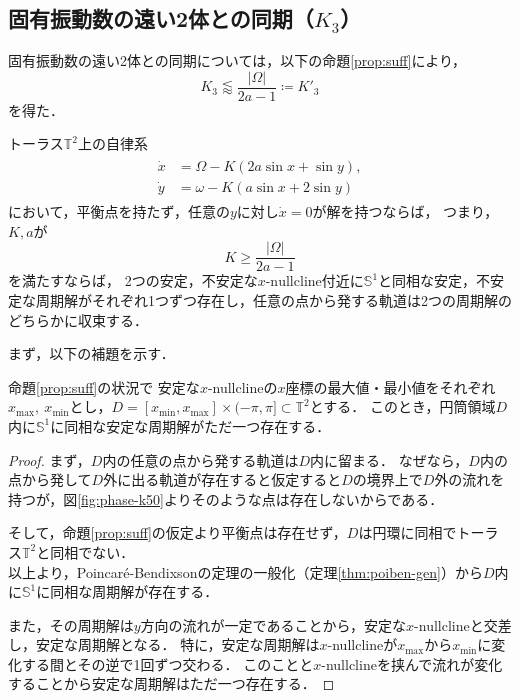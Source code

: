 \documentclass[../main]{subfiles}
\begin{document}
    \subsection{固有振動数の遠い2体との同期（$K_3$）}
    \label{sec:3body-k3}
    固有振動数の遠い2体との同期については，以下の命題\ref{prop:suff}により，
    \begin{equation}
        \label{eq;:K2-approx}
        K_3\lessapprox \frac{|\Omega|}{2a-1}\coloneqq K'_3
    \end{equation}
    を得た．
    \begin{proposition}
        \label{prop:suff}
        トーラス$\mathbb{T}^2$上の自律系
        \begin{align}
            \label{eq:prop-2phase}
            \begin{split}
                \dot{x}&=\Omega-K(2a\sin x+\sin y),\\
                \dot{y}&=\omega-K(a\sin x+2\sin y)
            \end{split}
        \end{align}
        において，平衡点を持たず，任意の$y$に対し$\dot{x}=0$が解を持つならば，
        つまり，$K,a$が
        \begin{equation*}
            K\geq \frac{|\Omega|}{2a-1}
        \end{equation*}
        を満たすならば，
        2つの安定，不安定な$x$-$\mathrm{nullcline}$付近に$\mathbb{S}^1$と同相な安定，不安定な周期解がそれぞれ1つずつ存在し，任意の点から発する軌道は2つの周期解のどちらかに収束する．
    \end{proposition}
    まず，以下の補題を示す．
    \begin{lemma}
        \label{lemma:annulus}
        命題\ref{prop:suff}の状況で
        安定な$x$-nullclineの$x$座標の最大値・最小値をそれぞれ$x_{\max},\ x_{\min}$とし，$D=[x_{\min},x_{\max}]\times (-\pi,\pi ]\subset\mathbb{T}^2$とする．
        このとき，円筒領域$D$内に$\mathbb{S}^1$に同相な安定な周期解がただ一つ存在する．        
    \end{lemma}
    \begin{proof}
        まず，$D$内の任意の点から発する軌道は$D$内に留まる．
        なぜなら，$D$内の点から発して$D$外に出る軌道が存在すると仮定すると$D$の境界上で$D$外の流れを持つが，図\ref{fig:phase-k50}よりそのような点は存在しないからである．

        そして，命題\ref{prop:suff}の仮定より平衡点は存在せず，$D$は円環に同相でトーラス$\mathbb{T}^2$と同相でない．\\
        以上より，Poincar\'{e}-Bendixsonの定理の一般化（定理\ref{thm:poiben-gen}）から$D$内に$\mathbb{S}^1$に同相な周期解が存在する．
        
        また，その周期解は$y$方向の流れが一定であることから，安定な$x$-nullclineと交差し，安定な周期解となる．
        特に，安定な周期解は$x$-nullclineが$x_{\max}$から$x_{\min}$に変化する間とその逆で1回ずつ交わる．
        このことと$x$-nullclineを挟んで流れが変化することから安定な周期解はただ一つ存在する．    
    \end{proof}
\end{document}
